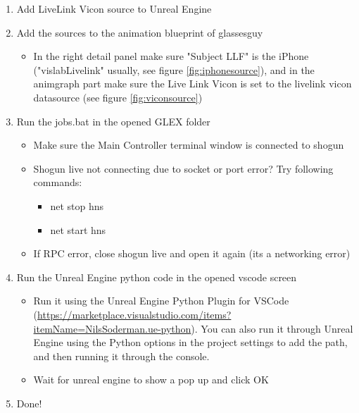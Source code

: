 \documentclass{uva-inf-article}
\begin{document}
\begin{enumerate}
\begin{itemize}
    \end{itemize}
    \item Add LiveLink Vicon source to Unreal Engine
    \item Add the sources to the animation blueprint of glassesguy
    \begin{itemize}
        \item In the right detail panel make sure "Subject LLF" is the iPhone ("vislabLivelink" usually, see figure \ref{fig:iphonesource}), and in the animgraph part make sure the Live Link Vicon is set to the livelink vicon datasource (see figure \ref{fig:viconsource})
    \end{itemize}
    \item Run the jobs.bat in the opened GLEX folder
    \begin{itemize}
        \item Make sure the Main Controller terminal window is connected to shogun
        \item Shogun live not connecting due to socket or port error? Try following commands:
        \begin{itemize}
            \item net stop hns
            \item net start hns
        \end{itemize}
        \item If RPC error, close shogun live and open it again (its a networking error)
    \end{itemize}
    \item Run the Unreal Engine python code in the opened vscode screen
    \begin{itemize}
        \item Run it using the Unreal Engine Python Plugin for VSCode (\url{https://marketplace.visualstudio.com/items?itemName=NilsSoderman.ue-python}). You can also run it through Unreal Engine using the Python options in the project settings to add the path, and then running it through the console.
        \item Wait for unreal engine to show a pop up and click OK
    \end{itemize}
    \item Done!
\end{enumerate}
\end{document}
